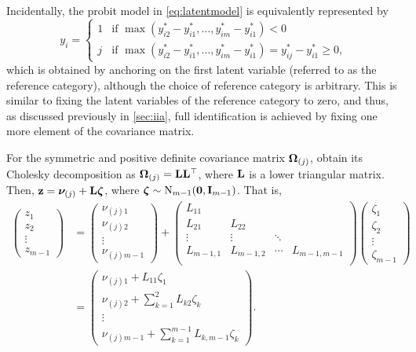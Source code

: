 \begin{remark}
  Incidentally, the probit model in \cref{eq:latentmodel} is equivalently represented by 
  \begin{equation}\label{eq:latentmodel2}
    y_i = 
    \begin{cases}
      1 & \text{if } \max (y_{i2}^* - y_{i1}^*,\dots,y_{im}^* - y_{i1}^*) < 0 \\
      j & \text{if } \max (y_{i2}^* - y_{i1}^*,\dots,y_{im}^* - y_{i1}^*) = y_{ij}^* - y_{i1}^* \geq 0,
    \end{cases}
  \end{equation}   
  which is obtained by anchoring on the first latent variable (referred to as the reference category), although the choice of reference category is arbitrary.
  This is similar to fixing the latent variables of the reference category to zero, and thus, as discussed previously in \cref{sec:iia}, full identification is achieved by fixing one more element of the covariance matrix.
\end{remark}

For the symmetric and positive definite covariance matrix ${\bm\Omega}_{(j)}$, obtain its Cholesky decomposition as ${\bm\Omega}_{(j)} = {\mathbf L}{\mathbf L}^\top$, where ${\mathbf L}$ is a lower triangular matrix.
Then, ${\mathbf z} = {\bm\nu}_{(j)} + {\mathbf L}{\bm\zeta}$, where ${\bm\zeta} \sim\operatorname{N}_{m-1}({\mathbf 0},{\mathbf I}_{m-1})$.
That is,
\begin{align*}
  \begin{pmatrix}
    z_1 \\
    z_2 \\
    \vdots \\
    z_{m-1}
  \end{pmatrix}  
  &=
  \begin{pmatrix}
    \nu_{(j)1} \\
    \nu_{(j)2} \\    
    \vdots \\
    \nu_{(j)m-1}
  \end{pmatrix}  
  + 
  \begin{pmatrix}
    L_{11} &       &       & \\
    L_{21} &L_{22} &       & \\
    \vdots &\vdots &\ddots & \\
    L_{m-1,1} &L_{m-1,2} &\cdots &L_{m-1,m-1} \\
  \end{pmatrix} 
  \begin{pmatrix}
    \zeta_1 \\
    \zeta_2 \\    
    \vdots \\
    \zeta_{m-1}
  \end{pmatrix} \\ %
  &=
  \begin{pmatrix}
    \nu_{(j)1} + L_{11}\zeta_1 \\
    \nu_{(j)2} + \sum_{k=1}^2 L_{k2} \zeta_k \\    
    \vdots \\
    \nu_{(j)m-1} + \sum_{k=1}^{m-1} L_{k,m-1} \zeta_k
  \end{pmatrix}.  
\end{align*}

